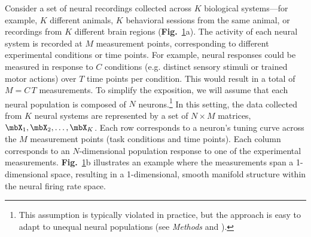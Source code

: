 \begin{figure}[p]
{    }
        \label{fig:schematic}
\end{figure}


Consider a set of neural recordings collected across $K$ biological systems---for example, $K$ different animals, $K$ behavioral sessions from the same animal, or recordings from $K$ different brain regions (\textbf{Fig.}~\ref{fig:schematic}a).
The activity of each neural system is recorded at $M$ measurement points, corresponding to different experimental conditions or time points.
For example, neural responses could be measured in response to $C$ conditions (e.g. distinct sensory stimuli or trained motor actions) over $T$ time points per condition.
This would result in a total of $M = C\,T$ measurements.
To simplify the exposition, we will assume that each neural population is composed of $N$ neurons.\footnote{This assumption is typically violated in practice, but the approach is easy to adapt to unequal neural populations (see \textit{Methods} and \cite{harvey2024duality}).} In this setting, the data collected from $K$ neural systems are represented by a set of $N \times M$ matrices, $\mbX_1, \mbX_2, \dots, \mbX_K$.
Each row corresponds to a neuron's tuning curve across the $M$ measurement points (task conditions and time points).
Each column corresponds to an $N$-dimensional population response to one of the experimental measurements.
\textbf{Fig.}~\ref{fig:schematic}b illustrates an example where the measurements span a 1-dimensional space, resulting in a 1-dimensional, smooth manifold structure within the neural firing rate space.

